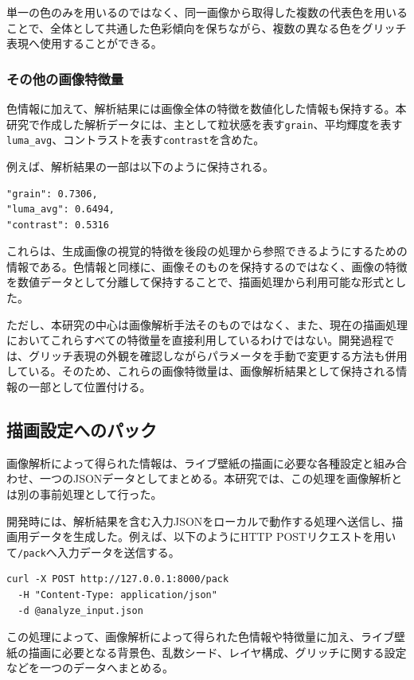 単一の色のみを用いるのではなく、同一画像から取得した複数の代表色を用いることで、全体として共通した色彩傾向を保ちながら、複数の異なる色をグリッチ表現へ使用することができる。


\subsubsection{その他の画像特徴量}

色情報に加えて、解析結果には画像全体の特徴を数値化した情報も保持する。本研究で作成した解析データには、主として粒状感を表す\texttt{grain}、平均輝度を表す\texttt{luma\_avg}、コントラストを表す\texttt{contrast}を含めた。

例えば、解析結果の一部は以下のように保持される。

\begin{verbatim}
"grain": 0.7306,
"luma_avg": 0.6494,
"contrast": 0.5316
\end{verbatim}

これらは、生成画像の視覚的特徴を後段の処理から参照できるようにするための情報である。色情報と同様に、画像そのものを保持するのではなく、画像の特徴を数値データとして分離して保持することで、描画処理から利用可能な形式とした。

ただし、本研究の中心は画像解析手法そのものではなく、また、現在の描画処理においてこれらすべての特徴量を直接利用しているわけではない。開発過程では、グリッチ表現の外観を確認しながらパラメータを手動で変更する方法も併用している。そのため、これらの画像特徴量は、画像解析結果として保持される情報の一部として位置付ける。


\subsection{描画設定へのパック}

画像解析によって得られた情報は、ライブ壁紙の描画に必要な各種設定と組み合わせ、一つのJSONデータとしてまとめる。本研究では、この処理を画像解析とは別の事前処理として行った。

開発時には、解析結果を含む入力JSONをローカルで動作する処理へ送信し、描画用データを生成した。例えば、以下のようにHTTP POSTリクエストを用いて\texttt{/pack}へ入力データを送信する。

\begin{verbatim}
curl -X POST http://127.0.0.1:8000/pack 
  -H "Content-Type: application/json" 
  -d @analyze_input.json
\end{verbatim}

この処理によって、画像解析によって得られた色情報や特徴量に加え、ライブ壁紙の描画に必要となる背景色、乱数シード、レイヤ構成、グリッチに関する設定などを一つのデータへまとめる。

